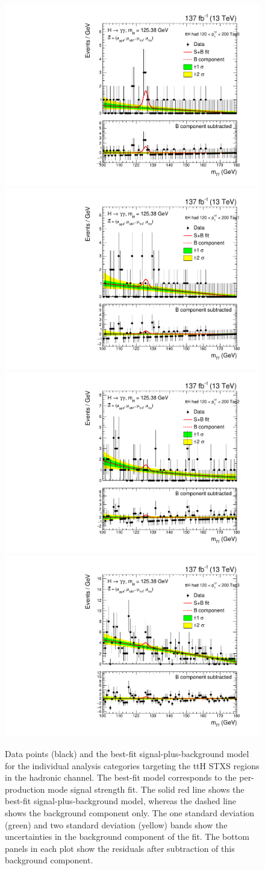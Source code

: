 \begin{figure}
  \includegraphics[width=.32\linewidth]{Figures/app_sb_models/RECO_TTH_HAD_PTH_120_200_Tag0_CMS_hgg_mass.pdf}
  \includegraphics[width=.32\linewidth]{Figures/app_sb_models/RECO_TTH_HAD_PTH_120_200_Tag1_CMS_hgg_mass.pdf}
  \includegraphics[width=.32\linewidth]{Figures/app_sb_models/RECO_TTH_HAD_PTH_120_200_Tag2_CMS_hgg_mass.pdf}
  \includegraphics[width=.32\linewidth]{Figures/app_sb_models/RECO_TTH_HAD_PTH_120_200_Tag3_CMS_hgg_mass.pdf}
  \caption[Observed diphoton mass distributions: ttH]
  {
    Data points (black) and the best-fit signal-plus-background model for the individual analysis categories targeting the ttH STXS regions in the hadronic channel. The best-fit model corresponds to the per-production mode signal strength fit. The solid red line shows the best-fit signal-plus-background model, whereas the dashed line shows the background component only. The one standard deviation (green) and two standard deviation (yellow) bands show the uncertainties in the background component of the fit. The bottom panels in each plot show the residuals after subtraction of this background component.
  }
  \label{fig:diphoton_mass_5}
\end{figure}

